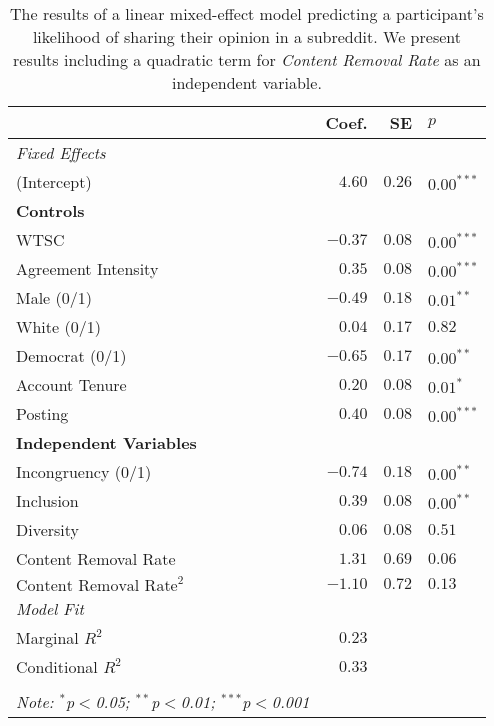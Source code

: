 \begin{table}[]
    \footnotesize
    \centering
    \caption{The results of a linear mixed-effect model predicting a participant's likelihood of sharing their opinion in a subreddit. We present results including a quadratic term for \emph{Content Removal Rate} as an independent variable.}
    \begin{tabular}{lrrl}
    \toprule
     & Coef. & SE & $p$ \\ \midrule
    \textit{Fixed Effects} & & \\
    (Intercept) & $4.60$ & $0.26$ & $0.00^{***}$\\  \addlinespace
    \textbf{Controls} \\
    WTSC & $-0.37$ & $0.08$ & $0.00^{***}$\\ 
    Agreement Intensity & $0.35$ & $0.08$ & $0.00^{***}$\\
    Male (0/1) & $-0.49$ & $0.18$ & $0.01^{**}$ \\
    White (0/1) & $0.04$ & $0.17$ & $0.82$ \\ 
    Democrat (0/1) & $-0.65$ & $0.17$ &$0.00^{**}$ \\
    Account Tenure &  $0.20$ & $0.08$ & $0.01^{*}$ \\
    Posting & $0.40$ & $0.08$ & $0.00^{***}$ \\ \addlinespace
    \textbf{Independent Variables} \\
    Incongruency (0/1) & $-0.74$ & $0.18$ & $0.00^{**}$ \\
    Inclusion & $0.39$ & $0.08$ & $0.00^{**}$ \\
    Diversity & $0.06$ & $0.08$ & $0.51$ \\
    Content Removal Rate & $1.31$ & $0.69$ & $0.06$\\ 
    $\text{Content Removal Rate}^2$ & $-1.10$ & $0.72$ & $0.13$\\\addlinespace
    [1.2ex]
    \midrule
    \textit{Model Fit} & & \\ 
    Marginal $R^2$ & $0.23$  \\
    Conditional $R^2$ & $0.33$ \\
    \hline \\[-1.8ex] 
    \textit{Note: $^{*}$p$<$0.05; $^{**}$p$<$0.01; $^{***}$p$<$0.001} \\ 
    \bottomrule
    \end{tabular}
    \label{tab:quadratic}
\end{table}